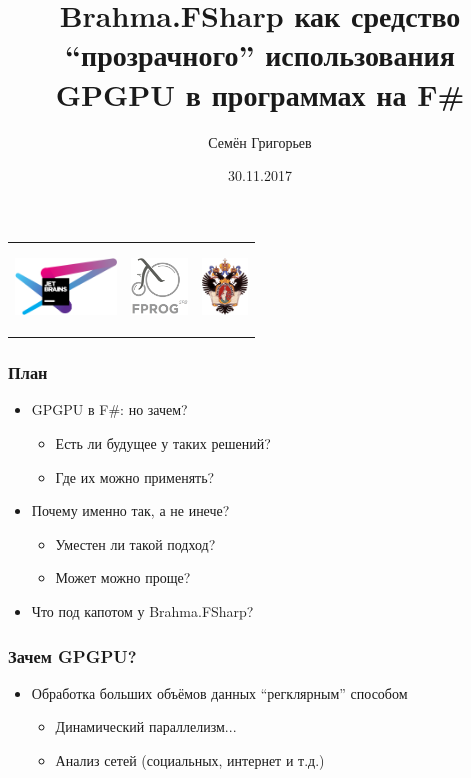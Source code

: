 \documentclass[xcolor=table]{beamer}
\title[Brahma.FSharp]{Brahma.FSharp как средство ``прозрачного'' использования GPGPU в программах на F\#}
\institute[СПбГУ]{
JetBrains Research, лаборатория языковых инструментов \\
Санкт-Петербургский государственный университет
}
\author[Семён Григорьев]{Семён Григорьев}
\date{30.11.2017}
\begin{document}
{
\begin{frame}[fragile]
  \begin{tabular}{p{2.5cm} p{6.5cm} p{2cm}}
   \begin{center}
      \includegraphics[height=1.5cm]{pictures/JBLogo3.pdf}
    \end{center}
    &
    \begin{center}
      \includegraphics[height=1.5cm]{pictures/fprog_logo.png}
    \end{center} 
    &
    \begin{center}
      \includegraphics[height=1.5cm]{pictures/SPbGU_Logo.png}
    \end{center}
  \end{tabular}
  \titlepage
\end{frame}
}


\begin{frame}[fragile]
  \transwipe[direction=90]
  \frametitle{План}
  \begin{itemize}
  \item GPGPU в F\#: но зачем?
    \begin{itemize}
        \item Есть ли будущее у таких решений?
        \item Где их можно применять?
    \end{itemize}
  \item Почему именно так, а не инече?
      \begin{itemize}
        \item Уместен ли такой подход?
        \item Может можно проще?
      \end{itemize}
   \item Что под капотом у Brahma.FSharp?
  \end{itemize}
\end{frame}

\begin{frame}[fragile]
  \transwipe[direction=90]
  \frametitle{Зачем GPGPU?}
  \begin{itemize}
  \item Обработка больших объёмов данных ``регклярным'' способом
    \begin{itemize}
        \item Динамический параллелизм...
        \item Анализ сетей (социальных, интернет и т.д.)
    \end{itemize}
    \end{itemize}
\end{frame}
\end{document}
